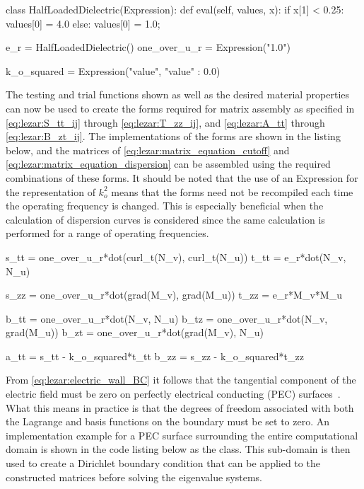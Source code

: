 \begin{python}
class HalfLoadedDielectric(Expression):
    def eval(self, values, x):
        if x[1] < 0.25:
            values[0] = 4.0
        else:
            values[0] = 1.0;

e_r = HalfLoadedDielectric()
one_over_u_r = Expression("1.0")

k_o_squared = Expression("value", {"value" : 0.0})
\end{python}

The testing and trial functions shown as well as the desired material
properties can now be used to create the forms required for matrix
assembly as specified in \eqref{eq:lezar:S_tt_ij}
through \eqref{eq:lezar:T_zz_ij}, and \eqref{eq:lezar:A_tt}
through \eqref{eq:lezar:B_zt_ij}. The implementations of the forms are
shown in the listing below, and the matrices
of \eqref{eq:lezar:matrix_equation_cutoff}
and \eqref{eq:lezar:matrix_equation_dispersion} can be assembled using
the required combinations of these forms. It should be noted that the
use of an Expression for the representation of $k_o^2$ means that the
forms need not be recompiled each time the operating frequency is
changed. This is especially beneficial when the calculation of
dispersion curves is considered since the same calculation is
performed for a range of operating frequencies.

\begin{python}
s_tt = one_over_u_r*dot(curl_t(N_v), curl_t(N_u))
t_tt = e_r*dot(N_v, N_u)

s_zz = one_over_u_r*dot(grad(M_v), grad(M_u))
t_zz = e_r*M_v*M_u

b_tt = one_over_u_r*dot(N_v, N_u)
b_tz = one_over_u_r*dot(N_v, grad(M_u))
b_zt = one_over_u_r*dot(grad(M_v), N_u)

a_tt = s_tt - k_o_squared*t_tt
b_zz = s_zz - k_o_squared*t_zz
\end{python}

From \eqref{eq:lezar:electric_wall_BC} it follows that the tangential
component of the electric field must be zero on perfectly electrical
conducting (PEC) surfaces~\citep{Smith1997}. What this means in
practice is that the degrees of freedom associated with both the
Lagrange and \nedelec{} basis functions on the boundary must be set to
zero. An implementation example for a PEC surface surrounding the
entire computational domain is shown in the code listing below as the
 class. This sub-domain is then used to create a
Dirichlet boundary condition that can be applied to the constructed
matrices before solving the eigenvalue systems.

